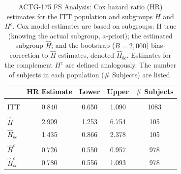\documentclass[9pt]{article}\usepackage[]{graphicx}\usepackage[]{xcolor}
\theoremstyle{definition}
\theoremstyle{remark}
\begin{document}
\begin{table}[!h]

\caption{\label{tab:fs_tab}\label{tab:actg} ACTG-175 FS Analysis: Cox hazard ratio (HR) estimates for the ITT population and subgroups $H$ and $H^{c}$.
Cox model estimates are based on subgroups: H true (knowing the actual subgroup, a-priori); the estimated subgroup $\hat{H}$; and 
the bootstrap ($B=2,000$) bias-correction to $\hat{H}$ estimates, denoted $\hat{H}_{bc}$.  Estimates for the complement $H^{c}$ are defined analogously.
The number of subjects in each population ($\#$ Subjects) are listed.}
\centering
\fontsize{9}{11}\selectfont
\begin{tabular}[t]{lcccc}
\toprule
  & HR Estimate & Lower & Upper & $\#$ Subjects\\
\midrule
\addlinespace[0.3em]
\multicolumn{5}{l}{\textbf{ITT}}\\
\hspace{1em}ITT & 0.840 & 0.650 & 1.090 & 1083\\
\addlinespace[0.3em]
\multicolumn{5}{l}{\textbf{H subgroup estimates}}\\
\hspace{1em}$\hat{H}$ & 2.909 & 1.253 & 6.754 & 105\\
\hspace{1em}$\hat{H}_{bc}$ & 1.435 & 0.866 & 2.378 & 105\\
\addlinespace[0.3em]
\multicolumn{5}{l}{\textbf{H-complement subgroup estimates}}\\
\hspace{1em}$\hat{H}^{c}$ & 0.726 & 0.550 & 0.957 & 978\\
\hspace{1em}$\hat{H}^{c}_{bc}$ & 0.780 & 0.556 & 1.093 & 978\\
\bottomrule
\end{tabular}
\end{table}
\end{document}
